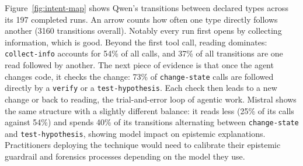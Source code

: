 \documentclass{IEEEcsmag}
\begin{document}
Figure~\ref{fig:intent-map} shows Qwen's transitions between declared types across its 197 completed runs. An arrow counts how often one type directly follows another (3160 transitions overall). Notably every run first opens by collecting information, which is good.
Beyond the first tool call, reading dominates: \texttt{collect-info} accounts for 54\% of all calls, and 37\% of all transitions are one read followed by another. 
The next piece of evidence is that once the agent changes code, it checks the change: 73\% of \texttt{change-state} calls are followed directly by a \texttt{verify} or a \texttt{test-hypothesis}.
Each check then leads to a new change or back to reading, the trial-and-error loop of agentic work. 
Mistral shows the same structure with a slightly different balance: it reads less (25\% of its calls against 54\%) and spends 40\% of its transitions alternating between \texttt{change-state} and \texttt{test-hypothesis}, showing model impact on epistemic explanations. Practitioners deploying the technique would need to calibrate their epistemic guardrail and forensics processes depending on the model they use.
\end{document}
